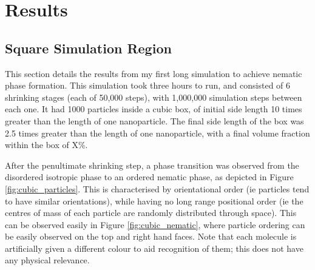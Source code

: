 \documentclass[11pt, a4paper]{article} %
\begin{document}
\section{Results}
\subsection{Square Simulation Region}
This section details the results from my first long simulation to achieve nematic phase formation. This simulation took three hours to run, and consisted of 6 shrinking stages (each of 50,000 steps), with 1,000,000 simulation steps between each one. It had 1000 particles inside a cubic box, of initial side length 10 times greater than the length of one nanoparticle. The final side length of the box was 2.5 times greater than the length of one nanoparticle, with a final volume fraction within the box of X\%.%

After the penultimate shrinking step, a phase transition was observed from the disordered isotropic phase to an ordered nematic phase, as depicted in Figure \ref{fig:cubic_particles}. This is characterised by orientational order (ie particles tend to have similar orientations), while having no long range positional order (ie the centres of mass of each particle are randomly distributed through space). This can be observed easily in Figure \ref{fig:cubic_nematic}, where particle ordering can be easily observed on the top and right hand faces. Note that each molecule is artificially given a different colour to aid recognition of them; this does not have any physical relevance.
\end{document}
